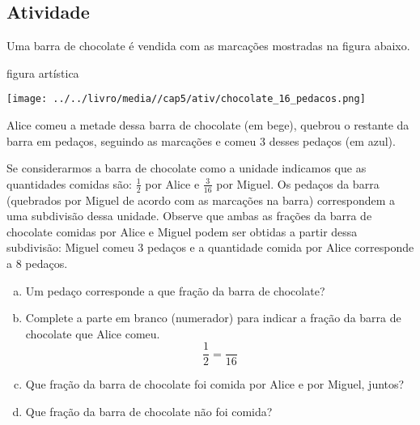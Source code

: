 \subsection{Atividade}


Uma barra de chocolate é vendida com as marcações mostradas na figura abaixo.
\begin{imagem*} [breakable]{}{} 
 figura artística
 
\texttt{[image: ../../livro/media//cap5/ativ/chocolate\_16\_pedacos.png]}
\end{imagem*}
 

Alice comeu a metade dessa barra de chocolate (em bege), quebrou o restante da barra em pedaços, seguindo as marcações e comeu 3 desses pedaços (em azul).

\begin{center}
\end{center}

Se considerarmos a barra de chocolate como a unidade indicamos que as quantidades comidas são: $\frac{1}{2}$ por Alice e $\frac{3}{16}$ por Miguel.
Os pedaços da barra (quebrados por Miguel de acordo com as marcações na barra) correspondem a uma subdivisão dessa unidade.
Observe que ambas as frações da barra de chocolate comidas por Alice e Miguel podem ser obtidas a partir dessa subdivisão: Miguel comeu 3 pedaços e a quantidade comida por Alice corresponde a 8 pedaços.
\begin{enumerate}[a)]
\item Um pedaço corresponde a que fração da barra de chocolate?
\item Complete a parte em branco (numerador) para indicar a fração da barra de chocolate que Alice comeu. $$\frac{1}{2} = \frac{ }{16}$$ 
\item Que fração da barra de chocolate foi comida por Alice e por Miguel, juntos?
\item  Que fração da barra de chocolate não foi comida?
\end{enumerate}

